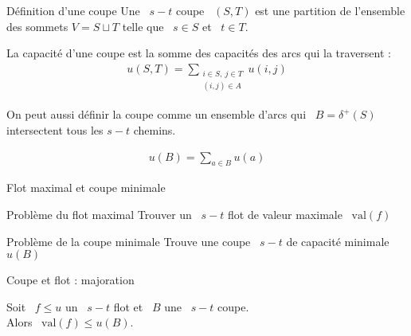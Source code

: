 \documentclass{beamer}
\newcommand{\val}{\mathrm{val}}
\begin{document}
\begin{frame}[t]{Définition d'une coupe} 
  Une ~$s-t$ coupe ~$(S, T)$ est une partition de l'ensemble des sommets $V = S \sqcup T$ telle que ~$s \in S$ et ~$t \in T$.

  \pause
  
  
  La capacité d'une coupe est la somme des capacités des arcs qui la traversent : \pause
  \begin{align*}
    u(S, T) = \sum_{\substack{i \in S,~ j \in T\\(i,j) \in A}} u(i,j)
  \end{align*}

   On peut aussi définir la coupe comme un ensemble d'arcs qui ~$B = \delta^+(S)$ intersectent tous les $s-t$ chemins.
   
  \begin{align*}
  	u(B) = \sum_{a \in B} u(a)
  \end{align*}
\end{frame}

\begin{frame}{Flot maximal et coupe minimale} \pause
  \vfill
  \begin{exampleblock}{Problème du flot maximal}
    Trouver un ~$s-t$ flot de valeur maximale ~$\val(f)$ 
  \end{exampleblock}
  \vfill \pause
  \begin{exampleblock}{Problème de la coupe minimale}
    Trouve une coupe ~$s-t$ de capacité minimale ~$u(B)$
  \end{exampleblock}
  \vfill
\end{frame}

    



\begin{frame}[t]{Coupe et flot : majoration}
  \begin{proposition}[6.3]
    Soit ~$f \leq u$ un ~$s-t$ flot et ~$B$ une ~$s-t$ coupe.\\
    Alors ~$\val(f) \leq u(B)$.
  \end{proposition}
\end{frame}
\end{document}
